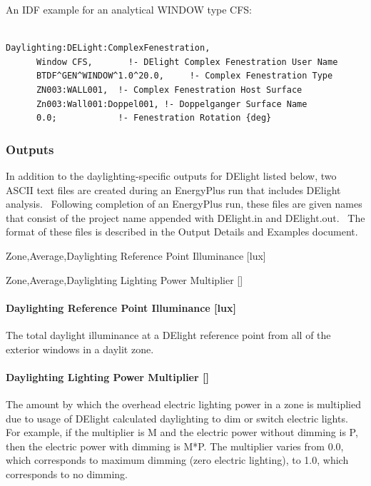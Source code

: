 An IDF example for an analytical WINDOW type CFS:

\begin{lstlisting}

Daylighting:DELight:ComplexFenestration,
      Window CFS,       !- DElight Complex Fenestration User Name
      BTDF^GEN^WINDOW^1.0^20.0,     !- Complex Fenestration Type
      ZN003:WALL001,  !- Complex Fenestration Host Surface
      Zn003:Wall001:Doppel001, !- Doppelganger Surface Name
      0.0;            !- Fenestration Rotation {deg}
\end{lstlisting}

\subsubsection{Outputs}\label{outputs-006}

In addition to the daylighting-specific outputs for DElight listed below, two ASCII text files are created during an EnergyPlus run that includes DElight analysis.~ Following completion of an EnergyPlus run, these files are given names that consist of the project name appended with DElight.in and DElight.out.~ The format of these files is described in the Output Details and Examples document.

Zone,Average,Daylighting Reference Point Illuminance {[}lux{]}

Zone,Average,Daylighting Lighting Power Multiplier {[]}

\paragraph{Daylighting Reference Point Illuminance {[}lux{]}}\label{daylighting-reference-point-illuminance-lux}

The total daylight illuminance at a DElight reference point from all of the exterior windows in a daylit zone.

\paragraph{Daylighting Lighting Power Multiplier {[]}}\label{daylighting-lighting-power-multiplier}

The amount by which the overhead electric lighting power in a zone is multiplied due to usage of DElight calculated daylighting to dim or switch electric lights. For example, if the multiplier is M and the electric power without dimming is P, then the electric power with dimming is M*P. The multiplier varies from 0.0, which corresponds to maximum dimming (zero electric lighting), to 1.0, which corresponds to no dimming.

